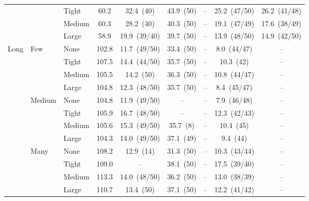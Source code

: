 \begin{table}[htbp]
{\begin{tabular}{lllcccccc}
 &  & {\small Tight} & 60.2 & 32.4~{\scriptsize(40)} & 43.9~{\scriptsize(50)} & -- & 25.2~{\scriptsize(47/50)} & 26.2~{\scriptsize(41/48)} \\
 &  & {\small Medium} & 60.3 & 28.2~{\scriptsize(40)} & 40.3~{\scriptsize(50)} & -- & 19.1~{\scriptsize(47/49)} & 17.6~{\scriptsize(38/49)} \\
 &  & {\small Large} & 58.9 & 19.9~{\scriptsize(39/40)} & 39.7~{\scriptsize(50)} & -- & 13.9~{\scriptsize(48/50)} & 14.9~{\scriptsize(42/50)} \\
\midrule
\multirow{12}{*}{\small Long} & \multirow{4}{*}{\small Few} & {\small None} & 102.8 & 11.7~{\scriptsize(49/50)} & 33.4~{\scriptsize(50)} & -- & 8.0~{\scriptsize(44/47)} & -- \\
 &  & {\small Tight} & 107.5 & 14.4~{\scriptsize(44/50)} & 35.7~{\scriptsize(50)} & -- & 10.3~{\scriptsize(42)} & -- \\
 &  & {\small Medium} & 105.5 & 14.2~{\scriptsize(50)} & 36.3~{\scriptsize(50)} & -- & 10.8~{\scriptsize(44/47)} & -- \\
 &  & {\small Large} & 104.8 & 12.3~{\scriptsize(48/50)} & 35.7~{\scriptsize(50)} & -- & 8.4~{\scriptsize(45/47)} & -- \\
 & \multirow{4}{*}{\small Medium} & {\small None} & 104.8 & 11.9~{\scriptsize(49/50)} & -- & -- & 7.9~{\scriptsize(46/48)} & -- \\
 &  & {\small Tight} & 105.9 & 16.7~{\scriptsize(48/50)} & -- & -- & 12.3~{\scriptsize(42/43)} & -- \\
 &  & {\small Medium} & 105.6 & 15.3~{\scriptsize(49/50)} & 35.7~{\scriptsize(8)} & -- & 10.4~{\scriptsize(45)} & -- \\
 &  & {\small Large} & 104.3 & 14.0~{\scriptsize(49/50)} & 37.1~{\scriptsize(49)} & -- & 9.4~{\scriptsize(44)} & -- \\
 & \multirow{4}{*}{\small Many} & {\small None} & 108.2 & 12.9~{\scriptsize(14)} & 31.3~{\scriptsize(50)} & -- & 10.3~{\scriptsize(43/44)} & -- \\
 &  & {\small Tight} & 109.0 & -- & 38.1~{\scriptsize(50)} & -- & 17.5~{\scriptsize(39/40)} & -- \\
 &  & {\small Medium} & 113.3 & 14.0~{\scriptsize(48/50)} & 36.2~{\scriptsize(50)} & -- & 13.0~{\scriptsize(38/39)} & -- \\
 &  & {\small Large} & 110.7 & 13.4~{\scriptsize(50)} & 37.1~{\scriptsize(50)} & -- & 12.2~{\scriptsize(41/42)} & -- \\
\bottomrule
\end{tabular}}
\end{table}

